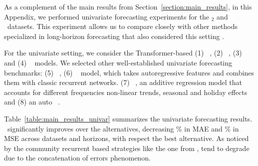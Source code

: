 As a complement of the main results from Section~\ref{section:main_results}, in this Appendix, we performed univariate forecasting experiments for the \ETTm$_{2}$ and \Exchange\ datasets. This experiment allows us to compare closely with other methods specialized in long-horizon forecasting that also considered this setting \citep{zhou2021informer, wu2021autoformer}.

For the univariate setting, we consider the Transformer-based (1) \Autoformer~\citep{wu2021autoformer}, (2) \Informer~\citep{zhou2021informer}, (3) \LogTrans~\citep{li2019logtrans} and (4) \Reformer~\citep{kitaev2020reformer} models. We selected other well-established univariate forecasting benchmarks: (5) \NBEATS~\citep{oreshkin2020nbeats}, (6) \DeepAR~\citep{salinas2020deepAR} model, which takes autoregressive features and combines them with classic recurrent networks. (7) \Prophet~\citep{taylor2018facebook_prophet}, an additive regression model that accounts for different frequencies non-linear trends, seasonal and holiday effects and (8) an auto \ARIMA~\citep{hyndman2008automatic_arima}.

Table~\ref{table:main_results_univar} summarizes the univariate forecasting results. \ours \ significantly improves over the alternatives, decreasing \univarMAEgains\% in MAE and \univarMSEgains\% in MSE across datasets and horizons, with respect the best alternative. As noticed by the community recurrent based strategies like the one from \ARIMA, tend to degrade due to the concatenation of errors phenomenon.

